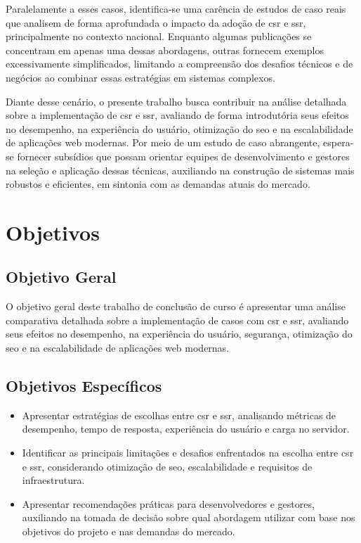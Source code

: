 Paralelamente a esses casos, identifica-se uma carência de estudos de caso reais que analisem de forma aprofundada o impacto da adoção de \acrshort{csr} e \acrshort{ssr}, principalmente no contexto nacional. Enquanto algumas publicações se concentram em apenas uma dessas abordagens, outras fornecem exemplos excessivamente simplificados, limitando a compreensão dos desafios técnicos e de negócios ao combinar essas estratégias em sistemas complexos.

Diante desse cenário, o presente trabalho busca contribuir na análise detalhada sobre a implementação de \acrshort{csr} e \acrshort{ssr}, avaliando de forma introdutória seus efeitos no desempenho, na experiência do usuário, otimização do \acrshort{seo} e na escalabilidade de aplicações web modernas. Por meio de um estudo de caso abrangente, espera-se fornecer subsídios que possam orientar equipes de desenvolvimento e gestores na seleção e aplicação dessas técnicas, auxiliando na construção de sistemas mais robustos e eficientes, em sintonia com as demandas atuais do mercado.

\section{Objetivos}

\subsection{Objetivo Geral}

O objetivo geral deste trabalho de conclusão de curso é apresentar uma análise comparativa detalhada sobre a implementação de casos com \acrshort{csr} e \acrshort{ssr}, avaliando seus efeitos no desempenho, na experiência do usuário, segurança, otimização do \acrshort{seo} e na escalabilidade de aplicações web modernas. 

\subsection{Objetivos Específicos}
\begin{itemize}
\item Apresentar estratégias de escolhas entre \acrshort{csr} e \acrshort{ssr}, analisando métricas de desempenho, tempo de resposta, experiência do usuário e carga no servidor.
\item Identificar as principais limitações e desafios enfrentados na escolha entre \acrshort{csr} e \acrshort{ssr}, considerando otimização de \acrshort{seo}, escalabilidade e requisitos de infraestrutura.
\item Apresentar recomendações práticas para desenvolvedores e gestores, auxiliando na tomada de decisão sobre qual abordagem utilizar com base nos objetivos do projeto e nas demandas do mercado.
\end{itemize}


